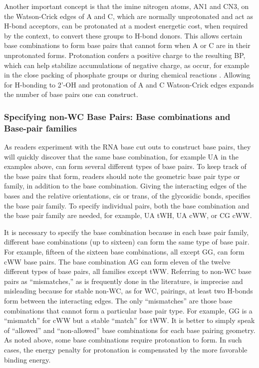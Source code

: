 Another important concept is that the imine nitrogen atoms, AN1 and CN3, on the
Watson-Crick edges of A and C, which are normally unprotonated and act as H-bond
acceptors, can be protonated at a modest energetic cost, when required by the
context, to convert these groups to H-bond donors. This allows certain base
combinations to form base pairs that cannot form when A or C are in their
unprotonated forms. Protonation confers a positive charge to the resulting BP,
which can help stabilize accumulations of negative charge, as occur, for example
in the close packing of phosphate groups or during chemical reactions
\cite{Siegfried2010, Cerrone-Szakal2008a}. Allowing for H-bonding to 2'-OH and
protonation of A and C Watson-Crick edges expands the number of base pairs one
can construct. 

\subsubsection{Specifying non-WC Base Pairs: Base combinations and Base-pair
families}

As readers experiment with the RNA base cut outs to construct base pairs, they
will quickly discover that the same base combination, for example UA in the
examples above, can form several different types of base pairs. To keep track of
the base pairs that form, readers should note the geometric base pair type or
family, in addition to the base combination. Giving the interacting edges of the
bases and the relative orientations, cis or trans, of the glycosidic bonds,
specifies the base pair family. To specify individual pairs, both the base
combination and the base pair family are needed, for example, UA tWH, UA cWW, or
CG cWW\@. 

It is necessary to specify the base combination because in each base pair
family, different base combinations (up to sixteen) can form the same type of
base pair. For example, fifteen of the sixteen base combinations, all except GG,
can form cWW base pairs. The base combination AG can form eleven of the twelve
different types of base pairs, all families except tWW\@. Referring to non-WC base
pairs as ``mismatches,'' as is frequently done in the literature, is imprecise and
misleading because for stable non-WC, as for WC, pairings, at least two H-bonds
form between the interacting edges. The only ``mismatches'' are those base
combinations that cannot form a particular base pair type. For example, GG is a
``mismatch'' for cWW but a stable ``match'' for tWW\@. It is better to simply speak of
``allowed'' and ``non-allowed'' base combinations for each base pairing geometry. As
noted above, some base combinations require protonation to form. In such cases,
the energy penalty for protonation is compensated by the more favorable binding
energy.

